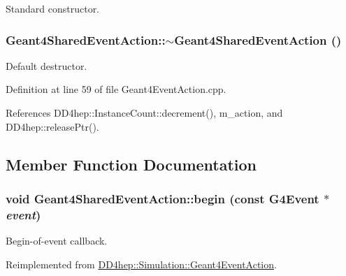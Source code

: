 Standard constructor. \hypertarget{class_d_d4hep_1_1_simulation_1_1_geant4_shared_event_action_a094e353ce282d06dac18c5752c078c63}{
\subsubsection[{$\sim$Geant4SharedEventAction}]{\setlength{\rightskip}{0pt plus 5cm}Geant4SharedEventAction::$\sim$Geant4SharedEventAction ()}}
\label{class_d_d4hep_1_1_simulation_1_1_geant4_shared_event_action_a094e353ce282d06dac18c5752c078c63}


Default destructor. 

Definition at line 59 of file Geant4EventAction.cpp.

References DD4hep::InstanceCount::decrement(), m\_\-action, and DD4hep::releasePtr().

\subsection{Member Function Documentation}
\hypertarget{class_d_d4hep_1_1_simulation_1_1_geant4_shared_event_action_a64b5998713b09c32de56774b1d69f64d}{
\subsubsection[{begin}]{\setlength{\rightskip}{0pt plus 5cm}void Geant4SharedEventAction::begin (const G4Event $\ast$ {\em event})}}
\label{class_d_d4hep_1_1_simulation_1_1_geant4_shared_event_action_a64b5998713b09c32de56774b1d69f64d}


Begin-\/of-\/event callback. 

Reimplemented from \hyperlink{class_d_d4hep_1_1_simulation_1_1_geant4_event_action_ad10785d157fa962f4ef2a5361bb0f5da}{DD4hep::Simulation::Geant4EventAction}.

